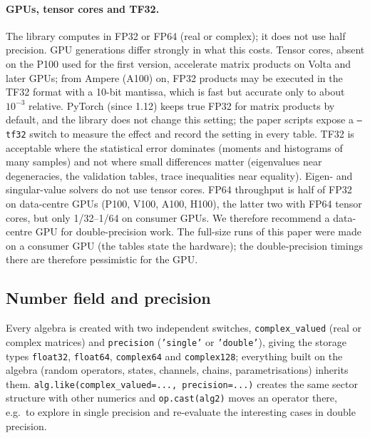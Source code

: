 \documentclass[11pt]{article}
\begin{document}
\paragraph{GPUs, tensor cores and TF32.} The library computes in FP32 or FP64 (real or complex); it does not use
half precision. GPU generations differ strongly in what this costs. Tensor cores, absent on the P100 used for the
first version, accelerate matrix products on Volta and later GPUs; from Ampere (A100) on, FP32 products may be
executed in the TF32 format with a 10-bit mantissa, which is fast but accurate only to about $10^{-3}$ relative.
PyTorch (since 1.12) keeps true FP32 for matrix products by default, and the library does not change this setting;
the paper scripts expose a \texttt{--tf32} switch to measure the effect and record the setting in every table.
TF32 is acceptable where the statistical error dominates (moments and histograms of many samples) and not where
small differences matter (eigenvalues near degeneracies, the validation tables, trace inequalities near equality). Eigen- and singular-value solvers do not use
tensor cores. FP64 throughput is half of FP32 on data-centre GPUs (P100, V100, A100, H100), the latter two with FP64
tensor cores, but only 1/32--1/64 on consumer GPUs. We therefore recommend a data-centre GPU for double-precision
work. The full-size runs of this paper were made on a consumer GPU (the tables state the hardware); the
double-precision timings there are therefore pessimistic for the GPU.

\subsection*{Number field and precision}\label{sec:numerics}

Every algebra is created with two independent switches, \texttt{complex\_valued} (real or complex
matrices) and \texttt{precision} (\texttt{'single'} or \texttt{'double'}), giving the storage types
\texttt{float32}, \texttt{float64}, \texttt{complex64} and \texttt{complex128}; everything built on the
algebra (random operators, states, channels, chains, parametrisations) inherits them.
\texttt{alg.like(complex\_valued=..., precision=...)} creates the same sector structure with other
numerics and \texttt{op.cast(alg2)} moves an operator there, e.g.\ to explore in single precision and
re-evaluate the interesting cases in double precision.
\end{document}

